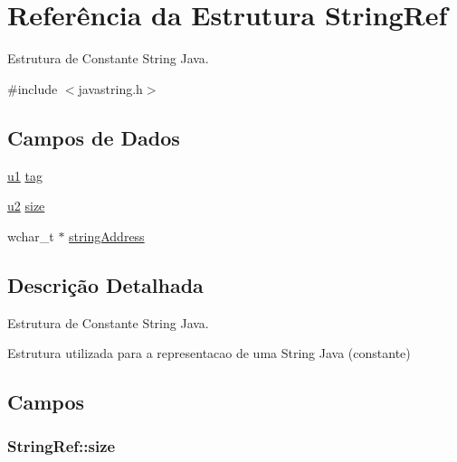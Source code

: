 \hypertarget{struct_string_ref}{}\section{Referência da Estrutura String\+Ref}
\label{struct_string_ref}


Estrutura de Constante String Java.  




{\ttfamily \#include $<$javastring.\+h$>$}

\subsection*{Campos de Dados}
\begin{DoxyCompactItemize}
\item 
\hyperlink{estruturas_8h_a216a9f8b04b4f0af84a4ca9d1d85a6ca}{u1} \hyperlink{struct_string_ref_a4d039a824a7ac849742acb2cbbfce77d}{tag}
\item 
\hyperlink{estruturas_8h_a5f223212eef04d10a4550ded680cb1cf}{u2} \hyperlink{struct_string_ref_ac00b58f387df69e78c10e4152332261f}{size}
\item 
wchar\+\_\+t $\ast$ \hyperlink{struct_string_ref_ae38ec52f1790f3c3cfb82c0ebcf72d2d}{string\+Address}
\end{DoxyCompactItemize}


\subsection{Descrição Detalhada}
Estrutura de Constante String Java. 

Estrutura utilizada para a representacao de uma String Java (constante) 

\subsection{Campos}
\subsubsection[{\texorpdfstring{size}{size}}]{ String\+Ref\+::size}\hypertarget{struct_string_ref_ac00b58f387df69e78c10e4152332261f}{}\label{struct_string_ref_ac00b58f387df69e78c10e4152332261f}
